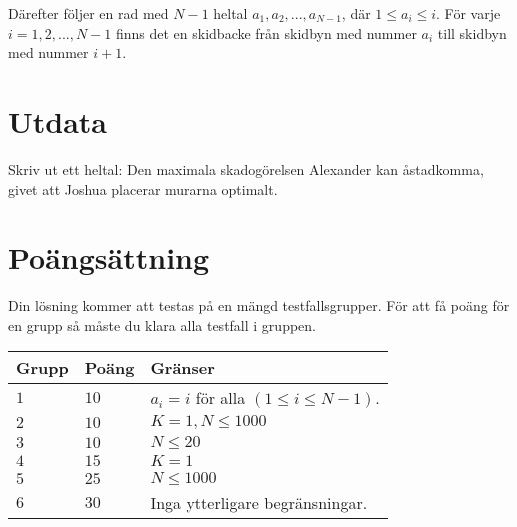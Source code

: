 Därefter följer en rad med $N-1$ heltal $a_1, a_2, ..., a_{N-1}$, där $1 \le a_i \le i$.
För varje $i = 1, 2, ..., N-1$ finns det en skidbacke från skidbyn med nummer $a_i$ till skidbyn med nummer $i+1$. 

\section*{Utdata}
Skriv ut ett heltal: Den maximala skadogörelsen Alexander kan åstadkomma, givet att Joshua placerar murarna optimalt.


\section*{Poängsättning}
Din lösning kommer att testas på en mängd testfallsgrupper.
För att få poäng för en grupp så måste du klara alla testfall i gruppen.

\noindent
\begin{tabular}{| l | l | p{12cm} |}
  \hline
  \textbf{Grupp} & \textbf{Poäng} & \textbf{Gränser} \\ \hline
  $1$    & $10$       & $a_i = i$ för alla $(1 \le i \le N-1)$. \\ \hline
  $2$    & $10$       & $K = 1, N \le 1000$ \\ \hline
  $3$    & $10$       & $N \le 20$ \\ \hline
  $4$    & $15$       & $K = 1$ \\ \hline
  $5$    & $25$       & $N \leq 1000$ \\ \hline
  $6$    & $30$       & Inga ytterligare begränsningar. \\ \hline
\end{tabular}


